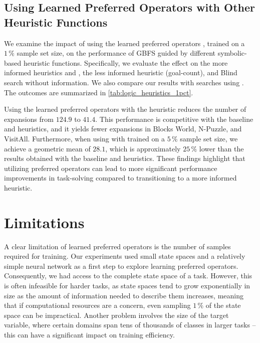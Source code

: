 \documentclass[ppgc,diss,english]{iiufrgs}
\begin{document}



\section{Using Learned Preferred Operators with Other Heuristic Functions}
\label{sec:other-heuristic-functions}
We examine the impact of using the learned preferred operators \pog, trained on a $1\,\%$ sample set size, on the performance of GBFS guided by different symbolic-based heuristic functions. Specifically, we evaluate the effect on the more informed heuristics \hff and \hadd, the less informed heuristic \hgc (goal-count), and Blind search without information. We also compare our results with searches using \poff. The outcomes are summarized in \cref{tab:logic_heuristics_1pct}.



Using the learned preferred operators \pog with the \hgc heuristic reduces the number of expansions from $124.9$ to $41.4$. This performance is competitive with the baseline \hff and \hadd heuristics, and it yields fewer expansions in Blocks World, N-Puzzle, and VisitAll. Furthermore, when using \hgc with \pog trained on a $5\,\%$ sample set size, we achieve a geometric mean of $28.1$, which is approximately $25\,\%$ lower than the results obtained with the baseline \hff and \hadd heuristics. These findings highlight that utilizing preferred operators can lead to more significant performance improvements in task-solving compared to transitioning to a more informed heuristic.


\chapter{Limitations}
\label{cha:limitations}
A clear limitation of learned preferred operators is the number of samples required for training. Our experiments used small state spaces and a relatively simple neural network as a first step to explore learning preferred operators. Consequently, we had access to the complete state space of a task. However, this is often infeasible for harder tasks, as state spaces tend to grow exponentially in size as the amount of information needed to describe them increases, meaning that if computational resources are a concern, even sampling $1\,\%$ of the state space can be impractical. Another problem involves the size of the target variable, where certain domains span tens of thousands of classes in larger tasks -- this can have a significant impact on training efficiency.
\end{document}
